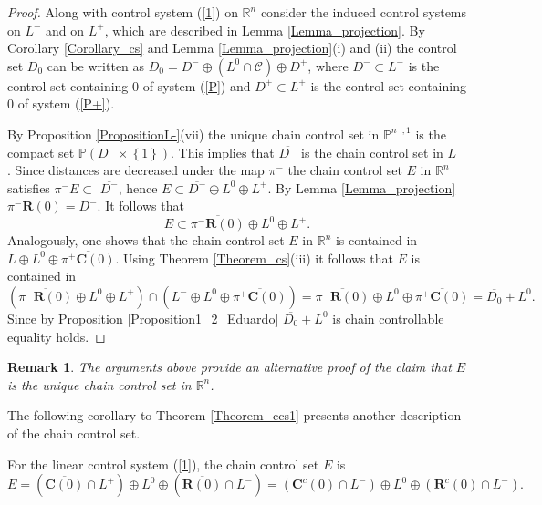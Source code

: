 \documentclass{siamltex}%
\newtheorem{remark}[theorem]{Remark}
\begin{document}
\begin{proof}
Along with control system (\ref{1}) on $\mathbb{R}^{n}$ consider the induced
control systems on $L^{-}$ and on $L^{+}$, which are described in Lemma
\ref{Lemma_projection}. By Corollary \ref{Corollary_cs} and Lemma
\ref{Lemma_projection}(i) and (ii) the control set $D_{0}$ can be written as
$D_{0}=D^{-}\oplus(L^{0}\cap\mathcal{C})\oplus D^{+}$, where $D^{-}\subset
L^{-}$ is the control set containing $0$ of system (\ref{P}) and $D^{+}\subset
L^{+}$ is the control set containing $0$ of system (\ref{P+}).

By Proposition \ref{PropositionL-}(vii) the unique chain control set in
$\mathbb{P}^{n^{-},1}$ is the compact set $\mathbb{P}(D^{-}\times\left\{
1\right\}  )$. This implies that $\overline{D^{-}}$ is the chain control set
in $L^{-}$. Since distances are decreased under the map $\pi^{-}$ the chain
control set $E$ in $\mathbb{R}^{n}$ satisfies $\pi^{-}E\subset$ $\overline
{D^{-}}$, hence $E\subset\overline{D^{-}}\oplus L^{0}\oplus L^{+}$. By Lemma
\ref{Lemma_projection} $\pi^{-}\mathbf{R}(0)=D^{-}$. It follows that
\[
E\subset\overline{\pi^{-}\mathbf{R}(0)}\oplus L^{0}\oplus L^{+}.
\]
Analogously, one shows that the chain control set $E$ in $\mathbb{R}^{n}$ is
contained in $L\oplus L^{0}\oplus\overline{\pi^{+}\mathbf{C}(0)}$. Using
Theorem \ref{Theorem_cs}(iii) it follows that $E$ is contained in
\[
\left(  \overline{\pi^{-}\mathbf{R}(0)}\oplus L^{0}\oplus L^{+}\right)
\cap\left(  L^{-}\oplus L^{0}\oplus\overline{\pi^{+}\mathbf{C}(0)}\right)
=\overline{\pi^{-}\mathbf{R}(0)}\oplus L^{0}\oplus\overline{\pi^{+}%
\mathbf{C}(0)}=\overline{D_{0}}+L^{0}.
\]
Since by Proposition \ref{Proposition1_2_Eduardo} $\overline{D_{0}}+L^{0}$ is
chain controllable equality holds.
\end{proof}

\begin{remark}
The arguments above provide an alternative proof of the claim that $E$ is the
unique chain control set in $\mathbb{R}^{n}$.
\end{remark}

The following corollary to Theorem \ref{Theorem_ccs1} presents another
description of the chain control set.

\begin{corollary}
For the linear control system (\ref{1}), the chain control set $E$ is%
\[
E=(\overline{\mathbf{C}(0)}\cap L^{+})\oplus L^{0}\oplus(\overline
{\mathbf{R}(0)}\cap L^{-})=(\mathbf{C}^{c}(0)\cap L^{-})\oplus L^{0}%
\oplus(\mathbf{R}^{c}(0)\cap L^{-}).
\]

\end{corollary}
\end{document}
